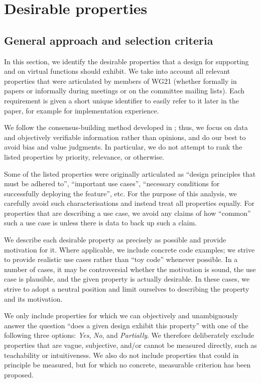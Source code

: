 \section{Desirable properties}
\label{properties}

\subsection{General approach and selection criteria}

In this section, we identify the desirable properties that a design for supporting  and  on virtual functions should exhibit. We take into account all relevant properties that were articulated by members of WG21 (whether formally in papers or informally during meetings or on the committee mailing lists). Each requirement is given a short unique identifier to easily refer to it later in the paper, for example  for implementation experience. 

We follow the consensus-building method developed in \cite{P3684R0}; thus, we focus on data and objectively verifiable information rather than opinions, and do our best to avoid bias and value judgments. In particular, we do not attempt to rank the listed properties by priority, relevance, or otherwise.

Some of the listed properties were originally articulated as ``design principles that must be adhered to'',  ``important use cases'', ``necessary conditions for successfully deploying the feature'', etc. For the purpose of this analysis, we carefully avoid such characterisations and instead treat all properties equally. For properties that are describing a use case, we avoid any claims of how ``common'' such a use case is unless there is data to back up such a claim.

We describe each desirable property as precisely as possible and provide motivation for it. Where applicable, we include concrete code examples; we strive to provide realistic use cases rather than ``toy code'' whenever possible. In a number of cases, it may be controversial whether the motivation is sound, the use case is plausible, and the given property is actually desirable. In these cases, we strive to adopt a neutral position and limit ourselves to describing the property and its motivation.

We only include properties for which we can objectively and unambiguously answer the question ``does a given design exhibit this property'' with one of the following three options: \emph{Yes}, \emph{No}, and \emph{Partially}. We therefore deliberately exclude properties that are vague, subjective, and/or cannot be measured directly, such as teachability or intuitiveness. We also do not include properties that could in principle be measured, but for which no concrete, measurable criterion has been proposed.

